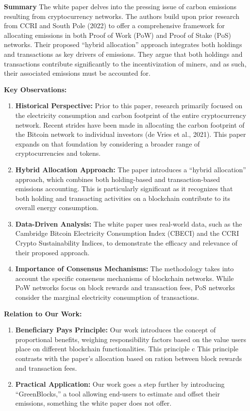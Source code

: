 \documentclass{article}
\begin{document}
\textbf{Summary}
The white paper delves into the pressing issue of carbon emissions resulting from cryptocurrency networks. The authors build upon prior research from CCRI and South Pole (2022) to offer a comprehensive framework for allocating emissions in both Proof of Work (PoW) and Proof of Stake (PoS) networks. Their proposed ``hybrid allocation'' approach integrates both holdings and transactions as key drivers of emissions. They argue that both holdings and transactions contribute significantly to the incentivization of miners, and as such, their associated emissions must be accounted for.

\textbf{Key Observations:}
\begin{enumerate}
    \item \textbf{Historical Perspective:} Prior to this paper, research primarily focused on the electricity consumption and carbon footprint of the entire cryptocurrency network. Recent strides have been made in allocating the carbon footprint of the Bitcoin network to individual investors (de Vries et al., 2021). This paper expands on that foundation by considering a broader range of cryptocurrencies and tokens.
    \item \textbf{Hybrid Allocation Approach:} The paper introduces a ``hybrid allocation'' approach, which combines both holding-based and transaction-based emissions accounting. This is particularly significant as it recognizes that both holding and transacting activities on a blockchain contribute to its overall energy consumption.
    \item \textbf{Data-Driven Analysis:} The white paper uses real-world data, such as the Cambridge Bitcoin Electricity Consumption Index (CBECI) and the CCRI Crypto Sustainability Indices, to demonstrate the efficacy and relevance of their proposed approach.
    \item \textbf{Importance of Consensus Mechanisms:} The methodology takes into account the specific consensus mechanisms of blockchain networks. While PoW networks focus on block rewards and transaction fees, PoS networks consider the marginal electricity consumption of transactions.
\end{enumerate}

\textbf{Relation to Our Work:}
\begin{enumerate}
    \item \textbf{Beneficiary Pays Principle:} Our work introduces the concept of proportional benefits, weighing responsibility factors based on the value users place on different blockchain functionalities. This principle c This principle contrasts with the paper's allocation based on ration between block rewards and transaction fees.
    \item \textbf{Practical Application:} Our work goes a step further by introducing ``GreenBlocks,'' a tool allowing end-users to estimate and offset their emissions, something the white paper does not offer.
\end{enumerate}
\end{document}
